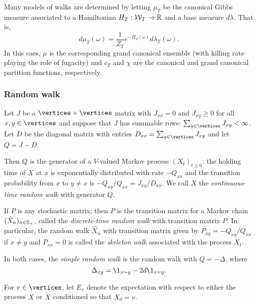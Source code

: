 Many models of walks are determined by letting $\mu_T$ be the canonical Gibbs measure
associated to a Hamiltonian $H_T : \mathcal{W}_T \rightarrow {\mathbb R}$ and a base measure $d\lambda$. That is,
\begin{equation}
d\mu_T(\omega) = \frac{1}{Z_T} e^{-H_T(\omega)} d\lambda_T(\omega).
\end{equation}
In this caes, $\mu$ is the corresponding grand canonical ensemble (with killing rate playing
the role of fugacity) and $c_T$ and $\chi$
are the canonical and grand canonical partition functions, respectively.



\subsubsection{Random walk}

Let $J$ be a $\vertices \times \vertices$
matrix with $J_{xx} = 0$ and $J_{xy} \ge 0$ for all $x, y \in \vertices$ and suppose
that $J$ has summable rows: $\sum_{y\in\vertices} J_{xy} < \infty$. Let $D$ be
the diagonal matrix with entries $D_{xx} = \sum_{y\in\vertices} J_{xy}$
and let $Q = J - D$.

Then $Q$ is the generator of a $V$-valued Markov process $(X_t)_{t \ge 0}$:
the holding time of $X$ at $x$ is exponentially distributed with rate $-Q_{xx}$
and the transition probability from $x$ to $y \ne x$ is
$-Q_{xy} / Q_{xx} = J_{xy} / D_{xx}$.
We call $X$ the \emph{continuous-time random walk} with generator $Q$.

If $P$ is any stochastic matrix, then $P$ is the transition matrix for a Markov chain
$(\tilde X_n)_{n\in{\mathbb Z}_+}$, called the \emph{discrete-time random walk} with transition matrix $P$.
In particular, the random walk $\hat X_n$ with transition matrix given by
$P_{xy} = -Q_{xy} / Q_{xx}$ if $x \ne y$ and $P_{xx} = 0$ is called the \emph{skeleton
walk} associated with the process $X_t$.

In both cases, the \emph{simple random walk} is the random walk with $Q = -\Delta$,
where
\begin{equation}
\Delta_{xy} = \1_{x \sim y} - 2 d \1_{x=y}.
\end{equation}

For $v \in \vertices$, let $E_v$ denote the expectation
with respect to either the process $X$ or $\tilde X$ conditioned so that $X_0 = v$.

